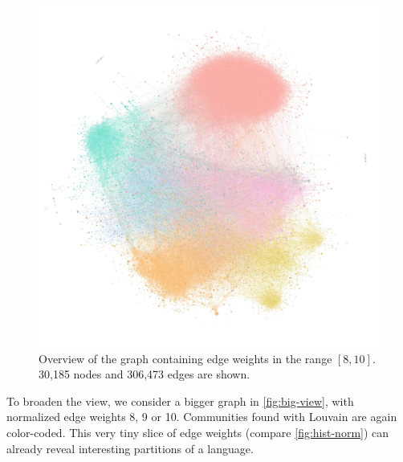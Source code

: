\vspace{-1em}

\begin{figure}[H]
    \centering
    \includegraphics[width=\linewidth, trim=1cm 4.8cm 0.5cm 3.2cm, clip]{assets/big view-min-min.jpg}
    \caption{Overview of the graph containing edge weights in the range $[8,10]$. 30,185 nodes and 306,473 edges are shown.}
    \label{fig:big-view}
\end{figure}

\vspace{-1.5em}

To broaden the view, we consider a bigger graph in \autoref{fig:big-view}, with normalized edge weights 8, 9 or 10. Communities found with Louvain are again color-coded. This very tiny slice of edge weights (compare \autoref{fig:hist-norm}) can already reveal interesting partitions of a language.

